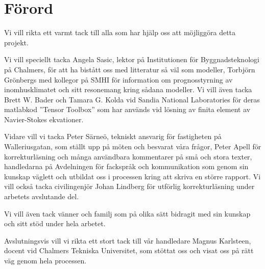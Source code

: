 \chapter*{Förord}


Vi vill rikta ett varmt tack till alla som har hjälp oss att möjliggöra detta projekt. 

Vi vill speciellt tacka Angela Sasic, lektor på Institutionen för Byggnadsteknologi på Chalmers, för att ha bistått oss med litteratur så väl som modeller, Torbjörn Grönbergs med kollegor på SMHI för information om prognosstyrning av inomhusklimatet och sitt resonemang kring sådana modeller. Vi vill även tacka Brett W. Bader och Tamara G. Kolda vid Sandia National Laboratories för deras matlabkod ''Tensor Toolbox'' som har används vid lösning av finita element av Navier-Stokes ekvationer.

Vidare vill vi tacka Peter Särneö, tekniskt ansvarig för fastigheten på Walleriusgatan, som ställt upp på möten och besvarat våra frågor, Peter Apell för korrekturläsning och många användbara kommentarer på små och stora texter, handledarna på Avdelningen för fackspråk och kommunikation som genom sin kunskap väglett och utbildat oss i processen kring att skriva en större rapport. Vi vill också tacka civilingenjör Johan Lindberg för utförlig korrekturläsning under arbetets avslutande del.

Vi vill även tack vänner och familj som på olika sätt bidragit med sin kunskap och sitt stöd under hela arbetet.

Avslutningsvis vill vi rikta ett stort tack till vår handledare Magnus Karlsteen, docent vid Chalmers Tekniska Universitet, som stöttat oss och visat oss på rätt väg genom hela processen.

